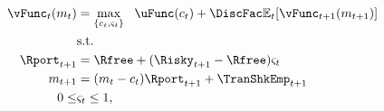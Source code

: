   \begin{equation*}\begin{gathered}\begin{aligned}
        \vFunc_{t}(m_{t})  & = \max_{\{{c}_{t},\varsigma_{t}\}}   ~~ \uFunc(c_{t}) +  \DiscFac
        \Ex_{t}[{\vFunc}_{t+1}(m_{t+1})]
        \\      & \text{s.t.} \nonumber
        \\      \Rport_{t+1}  & = \Rfree + (\Risky_{t+1}-\Rfree) \varsigma_{t}
        \\      m_{t+1}  & = (m_{t}-c_{t})\Rport_{t+1} + \TranShkEmp_{t+1}
        \\  0       \leq & \varsigma_{t}  \leq 1, \label{eq:noshorts}
      \end{aligned}\end{gathered}\end{equation*}
